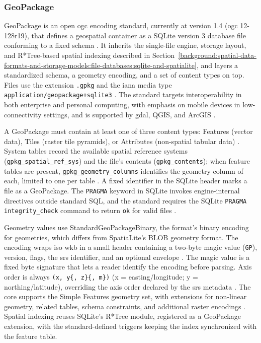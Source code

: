 \subsubsection{GeoPackage}
\label{background:spatial-data-formats-and-storage-models:file-databases:geopackage}
GeoPackage is an open \acrshort{ogc} encoding standard, currently at version 1.4 (\acrshort{ogc} 12-128r19), that defines a geospatial container as a SQLite version 3 database file conforming to a fixed schema \parencite{ogc2024_geopackage_encoding_standard_140}. It inherits the single-file engine, storage layout, and R*Tree-based spatial indexing described in Section~\ref{background:spatial-data-formats-and-storage-models:file-databases:sqlite-and-spatialite}, and layers a standardized schema, a geometry encoding, and a set of content types on top. Files use the extension \texttt{.gpkg} and the \acrshort{iana} media type \texttt{application/geopackage+sqlite3} \parencite{ogc2024_geopackage_encoding_standard_140}. The standard targets interoperability in both enterprise and personal computing, with emphasis on mobile devices in low-connectivity settings, and is supported by \acrshort{gdal}, QGIS, and ArcGIS \parencite{ogc2024_geopackage_encoding_standard_140}.

A GeoPackage must contain at least one of three content types: Features (vector data), Tiles (raster tile pyramids), or Attributes (non-spatial tabular data) \parencite{ogc2024_geopackage_encoding_standard_140}. System tables record the available spatial reference systems (\texttt{gpkg\_spatial\_ref\_sys}) and the file's contents (\texttt{gpkg\_contents}); when feature tables are present, \texttt{gpkg\_geometry\_columns} identifies the geometry column of each, limited to one per table \parencite{ogc2024_geopackage_encoding_standard_140}. A fixed identifier in the SQLite header marks a file as a GeoPackage. The \texttt{PRAGMA} keyword in SQLite invokes engine-internal directives outside standard SQL, and the standard requires the SQLite \texttt{PRAGMA integrity\_check} command to return \texttt{ok} for valid files \parencite{ogc2024_geopackage_encoding_standard_140}.

Geometry values use StandardGeoPackageBinary, the format's binary encoding for geometries, which differs from SpatiaLite's BLOB geometry format. The encoding wraps \acrshort{iso} \acrshort{wkb} in a small header containing a two-byte magic value (\texttt{GP}), version, flags, the \acrshort{srs} identifier, and an optional envelope \parencite{ogc2024_geopackage_encoding_standard_140}. The magic value is a fixed byte signature that lets a reader identify the encoding before parsing. Axis order is always \texttt{(x, y\{, z\}\{, m\})} (x = easting/longitude; y = northing/latitude), overriding the axis order declared by the \acrshort{srs} metadata \parencite{ogc2024_geopackage_encoding_standard_140}. The core supports the Simple Features geometry set, with extensions for non-linear geometry, related tables, schema constraints, and additional raster encodings \parencite{ogc2024_geopackage_encoding_standard_140}. Spatial indexing reuses SQLite's R*Tree module, registered as a GeoPackage extension, with the standard-defined triggers keeping the index synchronized with the feature table.


